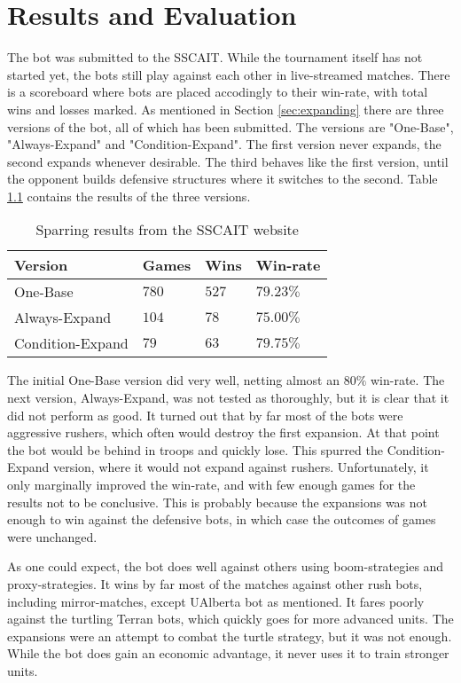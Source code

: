 \chapter{Results and Evaluation}
\label{ch:results}
The bot was submitted to the SSCAIT. While the tournament itself has not started yet, the bots still play against each other in live-streamed matches. There is a scoreboard where bots are placed accodingly to their win-rate, with total wins and losses marked. As mentioned in Section \ref{sec:expanding} there are three versions of the bot, all of which has been submitted. The versions are "One-Base", "Always-Expand" and "Condition-Expand". The first version never expands, the second expands whenever desirable. The third behaves like the first version, until the opponent builds defensive structures where it switches to the second. Table \ref{tab:results} contains the results of the three versions.

\begin{table}
\begin{center}
\begin{tabularx}{\linewidth}{|X||l|l|l|}
	\hline
	Version				& Games	& Wins	& Win-rate	\\
	\hline
	One-Base			& $780$	& $527$	& $79.23\%$	\\
	Always-Expand		& $104$	& $78$	& $75.00\%$	\\
	Condition-Expand	& $79$	& $63$	& $79.75\%$	\\
	\hline
\end{tabularx}
\end{center}
\caption{Sparring results from the SSCAIT website}
\label{tab:results}
\end{table}

The initial One-Base version did very well, netting almost an $80\%$ win-rate. The next version, Always-Expand, was not tested as thoroughly, but it is clear that it did not perform as good. It turned out that by far most of the bots were aggressive rushers, which often would destroy the first expansion. At that point the bot would be behind in troops and quickly lose. This spurred the Condition-Expand version, where it would not expand against rushers. Unfortunately, it only marginally improved the win-rate, and with few enough games for the results not to be conclusive. This is probably because the expansions was not enough to win against the defensive bots, in which case the outcomes of games were unchanged.

As one could expect, the bot does well against others using boom-strategies and proxy-strategies. It wins by far most of the matches against other rush bots, including mirror-matches, except UAlberta bot as mentioned. It fares poorly against the turtling Terran bots, which quickly goes for more advanced units. The expansions were an attempt to combat the turtle strategy, but it was not enough. While the bot does gain an economic advantage, it never uses it to train stronger units.

